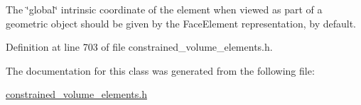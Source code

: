 The \char`\"{}global\char`\"{} intrinsic coordinate of the element when viewed as part of a geometric object should be given by the Face\+Element representation, by default. 



Definition at line 703 of file constrained\+\_\+volume\+\_\+elements.\+h.



The documentation for this class was generated from the following file\+:\begin{DoxyCompactItemize}
\item 
\hyperlink{constrained__volume__elements_8h}{constrained\+\_\+volume\+\_\+elements.\+h}\end{DoxyCompactItemize}
